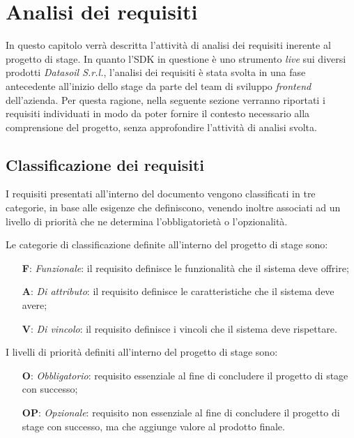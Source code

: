 \chapter{Analisi dei requisiti}
\label{chap:analisi-requisiti}
In questo capitolo verrà descritta l'attività di analisi dei requisiti inerente al progetto di stage. \newline
In quanto l'SDK in questione è uno strumento \textit{live} sui diversi prodotti \textit{Datasoil S.r.l.}, l'analisi dei requisiti è stata svolta
in una fase antecedente all'inizio dello stage da parte del team di sviluppo \textit{\gls{frontend}\glox} dell'azienda. \newline
Per questa ragione, nella seguente sezione verranno riportati i requisiti individuati in modo da poter fornire il contesto
necessario alla comprensione del progetto, senza approfondire l'attività di analisi svolta.

\section{Classificazione dei requisiti}
I requisiti presentati all'interno del documento vengono classificati in tre categorie, in base alle esigenze che definiscono, venendo inoltre
associati ad un livello di priorità che ne determina l'obbligatorietà o l'opzionalità. \newline

\newline
Le categorie di classificazione definite all'interno del progetto di stage sono:

\begin{itemize}
    \item[\textbf{F}:] \textit{Funzionale}: il requisito definisce le funzionalità che il sistema deve offrire;
    \item[\textbf{A}:] \textit{Di attributo}: il requisito definisce le caratteristiche che il sistema deve avere;
    \item[\textbf{V}:] \textit{Di vincolo}: il requisito definisce i vincoli che il sistema deve rispettare.
\end{itemize}

\newline
I livelli di priorità definiti all'interno del progetto di stage sono:

\begin{itemize}
    \item[\textbf{O}:] \textit{Obbligatorio}: requisito essenziale al fine di concludere il progetto di stage con successo;
    \item[\textbf{OP}:] \textit{Opzionale}: requisito non essenziale al fine di concludere il progetto di stage con successo, ma che aggiunge valore al prodotto finale.
\end{itemize}

